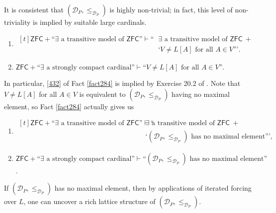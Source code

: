 \documentclass[12pt]{article}
\numberwithin{equation}{section}
\begin{document}
It is consistent that $(\mathcal{D}_P, \leq_{\mathcal{D}_P})$ is highly non-trivial; in fact, this level of non-triviality is implied by suitable large cardinals.

\begin{fact}\label{fact284}
\leavevmode
\begin{enumerate}[label=(\arabic*)]
    \item 
    \!
    $\begin{aligned}[t]
        \mathsf{ZFC} + \text{``} \exists \text{ a transitive model of } \mathsf{ZFC} \text{''} \vdash \text{``} & \exists \text{ a transitive model of } \mathsf{ZFC} \ + \\
        & \text{`} V \neq L[A] \text{ for all } A \in V \text{'''.}
    \end{aligned}$
    \item\label{432} $\mathsf{ZFC} + \text{``} \exists \text{ a strongly compact cardinal''} \vdash \text{``} V \neq L[A] \text{ for all } A \in V \text{''}$.
\end{enumerate}
\end{fact}

In particular, \ref{432} of Fact \ref{fact284} is implied by Exercise 20.2 of \cite{jech}. Note that $V \neq L[A]$ for all $A \in V$ is equivalent to $(\mathcal{D}_P, \leq_{\mathcal{D}_P})$ having no maximal element, so Fact \ref{fact284} actually gives us

\begin{enumerate}[label=(E\arabic*)]
    \item\label{e1}
    \!
    $\begin{aligned}[t]
        \mathsf{ZFC} + \text{``} \exists \text{ a transitive model of } \mathsf{ZFC} \text{''} \vdash \text{``} & \exists \text{ a transitive model of } \mathsf{ZFC} \ + \\
        & \text{`} (\mathcal{D}_P, \leq_{\mathcal{D}_P}) \text{ has no maximal element''',}
    \end{aligned}$
    \item $\mathsf{ZFC} + \text{``} \exists \text{ a strongly compact cardinal''} \vdash \text{``} (\mathcal{D}_P, \leq_{\mathcal{D}_P}) \text{ has no maximal element''}$.
\end{enumerate}
If $(\mathcal{D}_P, \leq_{\mathcal{D}_P})$ has no maximal element, then by applications of iterated forcing over $L$, one can uncover a rich lattice structure of $(\mathcal{D}_P, \leq_{\mathcal{D}_P})$.
\end{document}
